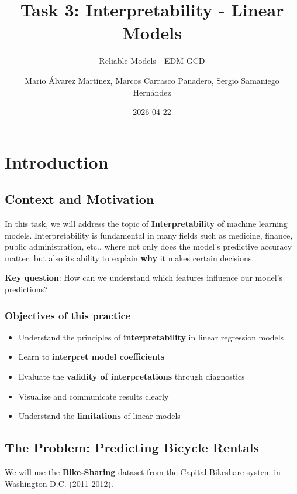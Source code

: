 \documentclass[
]{article}
\title{Task 3: Interpretability - Linear Models}
\subtitle{Reliable Models - EDM-GCD}
\author{Mario Álvarez Martínez, Marcos Carrasco Panadero, Sergio
Samaniego Hernández}
\date{2026-04-22}
\providecommand{\tightlist}{%
  \setlength{\itemsep}{0pt}\setlength{\parskip}{0pt}}
\begin{document}
\maketitle

{
\setcounter{tocdepth}{3}
\tableofcontents
}
\section{Introduction}\label{introduction}

\subsection{Context and Motivation}\label{context-and-motivation}

In this task, we will address the topic of \textbf{Interpretability} of
machine learning models. Interpretability is fundamental in many fields
such as medicine, finance, public administration, etc., where not only
does the model's predictive accuracy matter, but also its ability to
explain \textbf{why} it makes certain decisions.

\textbf{Key question}: How can we understand which features influence
our model's predictions?

\subsubsection{Objectives of this
practice}\label{objectives-of-this-practice}

\begin{itemize}
\tightlist
\item
  Understand the principles of \textbf{interpretability} in linear
  regression models
\item
  Learn to \textbf{interpret model coefficients}
\item
  Evaluate the \textbf{validity of interpretations} through diagnostics
\item
  Visualize and communicate results clearly
\item
  Understand the \textbf{limitations} of linear models
\end{itemize}

\subsection{The Problem: Predicting Bicycle
Rentals}\label{the-problem-predicting-bicycle-rentals}

We will use the \textbf{Bike-Sharing} dataset from the Capital Bikeshare
system in Washington D.C. (2011-2012).
\end{document}
